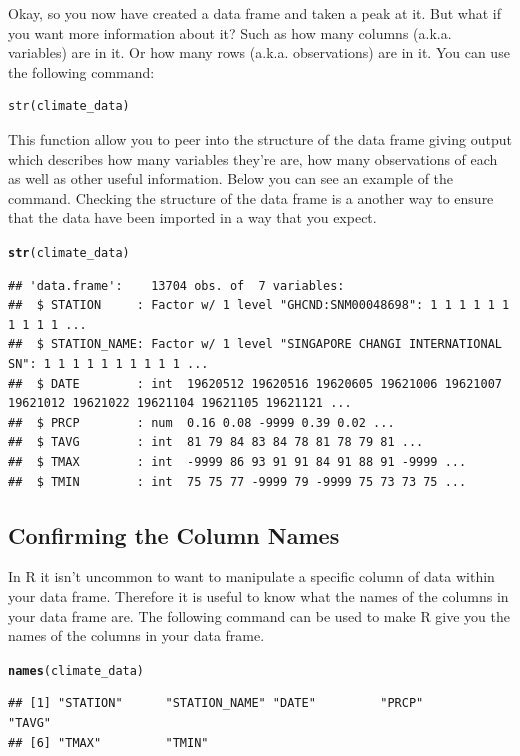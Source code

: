 \documentclass{article}\usepackage[]{graphicx}\usepackage[]{color}
\makeatletter
\newcommand{\hlstd}[1]{\textcolor[rgb]{0.345,0.345,0.345}{#1}}%
\newcommand{\hlkwd}[1]{\textcolor[rgb]{0.737,0.353,0.396}{\textbf{#1}}}%
\newenvironment{kframe}{%
 \def\at@end@of@kframe{}%
 \ifinner\ifhmode%
  \def\at@end@of@kframe{\end{minipage}}%
  \begin{minipage}{\columnwidth}%
 \fi\fi%
 \def\FrameCommand##1{\hskip\@totalleftmargin \hskip-\fboxsep
 \colorbox{shadecolor}{##1}\hskip-\fboxsep
     \hskip-\linewidth \hskip-\@totalleftmargin \hskip\columnwidth}%
 \MakeFramed {\advance\hsize-\width
   \@totalleftmargin\z@ \linewidth\hsize
   \@setminipage}}%
 {\par\unskip\endMakeFramed%
 \at@end@of@kframe}
\newenvironment{knitrout}{}{} %
\makeatother
\begin{document}
Okay, so you now have created a data frame and taken a peak at it. But what if you want more information about it? Such as how many columns (a.k.a. variables) are in it. Or how many rows (a.k.a. observations) are in it. You can use the following command: \\
\begin{verbatim}
str(climate_data)
\end{verbatim} 
This function allow you to peer into the structure of the data frame giving output which describes how many variables they're are, how many observations of each as well as other useful information. Below you can see an example of the command. Checking the structure of the data frame is a another way to ensure that the data have been imported in a way that you expect.
\begin{knitrout}
\color{fgcolor}\begin{kframe}
\begin{alltt}
\hlkwd{str}\hlstd{(climate_data)}
\end{alltt}
\begin{verbatim}
## 'data.frame':	13704 obs. of  7 variables:
##  $ STATION     : Factor w/ 1 level "GHCND:SNM00048698": 1 1 1 1 1 1 1 1 1 1 ...
##  $ STATION_NAME: Factor w/ 1 level "SINGAPORE CHANGI INTERNATIONAL SN": 1 1 1 1 1 1 1 1 1 1 ...
##  $ DATE        : int  19620512 19620516 19620605 19621006 19621007 19621012 19621022 19621104 19621105 19621121 ...
##  $ PRCP        : num  0.16 0.08 -9999 0.39 0.02 ...
##  $ TAVG        : int  81 79 84 83 84 78 81 78 79 81 ...
##  $ TMAX        : int  -9999 86 93 91 91 84 91 88 91 -9999 ...
##  $ TMIN        : int  75 75 77 -9999 79 -9999 75 73 73 75 ...
\end{verbatim}
\end{kframe}
\end{knitrout}
\subsection{Confirming the Column Names}
In R it isn't uncommon to want to manipulate a specific column of data within your data frame. Therefore it is useful to know what the names of the columns in your data frame are. The following command can be used to make R give you the names of the columns in your data frame. 

\begin{knitrout}
\color{fgcolor}\begin{kframe}
\begin{alltt}
\hlkwd{names}\hlstd{(climate_data)}
\end{alltt}
\begin{verbatim}
## [1] "STATION"      "STATION_NAME" "DATE"         "PRCP"         "TAVG"        
## [6] "TMAX"         "TMIN"
\end{verbatim}
\end{kframe}
\end{knitrout}
\end{document}

